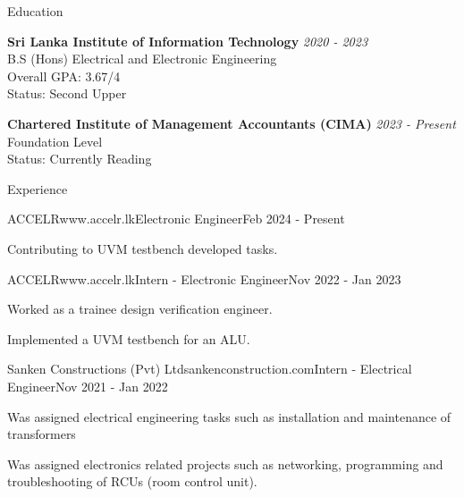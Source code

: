 \documentclass[
	11pt, %
]{./../assets/resume} %
\begin{document}

\begin{rSection}{Education}

	\textbf{Sri Lanka Institute of Information Technology} \hfill \textit{2020 - 2023} \\ 
	B.S (Hons) Electrical and Electronic Engineering \\
	Overall GPA: 3.67/4 \\
	Status: Second Upper

	\textbf{Chartered Institute of Management Accountants (CIMA)} \hfill \textit{2023 - Present} \\ 
	Foundation Level \\
	Status: Currently Reading
	
\end{rSection}


\begin{rSection}{Experience}

	\begin{rSubsectionX}{ACCELR}{www.accelr.lk}{Electronic Engineer}{Feb 2024 - Present}
		\item Contributing to UVM testbench developed tasks.
	\end{rSubsectionX}

	\begin{rSubsectionX}{ACCELR}{www.accelr.lk}{Intern - Electronic Engineer}{Nov 2022 - Jan 2023}
		\item Worked as a trainee design verification engineer.
		\item Implemented a UVM testbench for an ALU.
	\end{rSubsectionX}

	\begin{rSubsectionX}{Sanken Constructions (Pvt) Ltd}{sankenconstruction.com}{Intern - Electrical Engineer}{Nov 2021 - Jan 2022}
		\item Was assigned electrical engineering tasks such as installation and maintenance of transformers
		\item Was assigned electronics related projects such as networking, programming and troubleshooting of RCUs (room control unit).
	\end{rSubsectionX}

\end{rSection}
\end{document}
